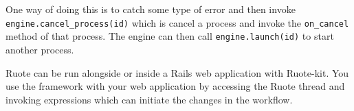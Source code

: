 \documentclass[document.tex]{subfiles}
\begin{document}

One way of doing this is to catch some type of error and then invoke \verb!engine.cancel_process(id)! which is cancel a process and invoke the \verb!on_cancel! method of that process. The engine can then call \verb!engine.launch(id)! to start another process.


Ruote can be run alongside or inside a Rails web application with Ruote-kit. You use the framework with your web application by accessing the Ruote thread and invoking expressions which can initiate the changes in the workflow.
\end{document}
